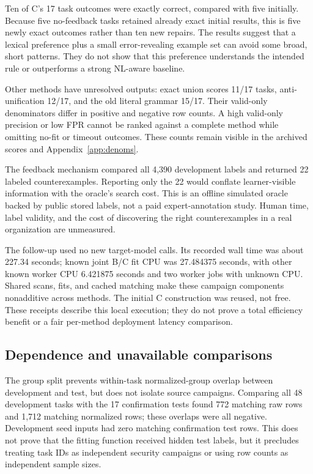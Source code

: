 \documentclass[10pt,twocolumn,letterpaper]{article}
\begin{document}
Ten of C's 17 task outcomes were exactly correct, compared with five initially. Because five no-feedback tasks retained already exact initial results, this is five newly exact outcomes rather than ten new repairs. The results suggest that a lexical preference plus a small error-revealing example set can avoid some broad, short patterns. They do not show that this preference understands the intended rule or outperforms a strong NL-aware baseline.

Other methods have unresolved outputs: exact union scores 11/17 tasks, anti-unification 12/17, and the old literal grammar 15/17. Their valid-only denominators differ in positive and negative row counts. A high valid-only precision or low FPR cannot be ranked against a complete method while omitting no-fit or timeout outcomes. These counts remain visible in the archived scores and Appendix~\ref{app:denoms}.

The feedback mechanism compared all 4,390 development labels and returned 22 labeled counterexamples. Reporting only the 22 would conflate learner-visible information with the oracle's search cost. This is an offline simulated oracle backed by public stored labels, not a paid expert-annotation study. Human time, label validity, and the cost of discovering the right counterexamples in a real organization are unmeasured.

The follow-up used no new target-model calls. Its recorded wall time was about 227.34 seconds; known joint B/C fit CPU was 27.484375 seconds, with other known worker CPU 6.421875 seconds and two worker jobs with unknown CPU. Shared scans, fits, and cached matching make these campaign components nonadditive across methods. The initial C construction was reused, not free. These receipts describe this local execution; they do not prove a total efficiency benefit or a fair per-method deployment latency comparison.

\subsection{Dependence and unavailable comparisons}
The group split prevents within-task normalized-group overlap between development and test, but does not isolate source campaigns. Comparing all 48 development tasks with the 17 confirmation tests found 772 matching raw rows and 1,712 matching normalized rows; these overlaps were all negative. Development seed inputs had zero matching confirmation test rows. This does not prove that the fitting function received hidden test labels, but it precludes treating task IDs as independent security campaigns or using row counts as independent sample sizes.
\end{document}
